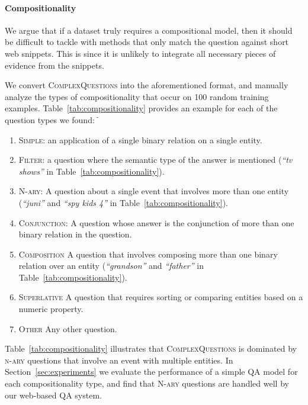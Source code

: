\documentclass[11pt,a4paper]{article}
\newcommand\nl[1]{{\it``#1''}}
\begin{document}
\paragraph{Compositionality}
We argue that if a dataset truly requires a compositional model, then it should be difficult to tackle with methods that only match the question against short web snippets. This is since it is unlikely to integrate all necessary pieces of evidence from the snippets.

We convert \textsc{ComplexQuestions} into the aforementioned format, and manually analyze the types of compositionality that occur on 100 random training examples. Table~\ref{tab:compositionality} provides an example for each of the  question types we found:
ֿ\begin{enumerate}[topsep=0pt,itemsep=0pt,partopsep=0pt,parsep=0pt]
\item[] \textsc{Simple}: an application of a single binary relation on a single entity.
\item[] \textsc{Filter}: a question where the semantic type of the answer is mentioned (\nl{tv shows} in Table~\ref{tab:compositionality}).
\item[] \textsc{N-ary}: A question about a single event that involves more than one entity (\nl{juni} and \nl{spy kids 4} in Table~\ref{tab:compositionality}).
\item[] \textsc{Conjunction}: A question whose answer is the conjunction of more than one binary relation in the question.
\item[] \textsc{Composition} A question that involves composing more than one binary relation over an entity (\nl{grandson} and \nl{father} in Table~\ref{tab:compositionality}).
\item[] \textsc{Superlative} A question that requires sorting or comparing entities based on a numeric property.
\item[] \textsc{Other} Any other question.
\end{enumerate}

Table~\ref{tab:compositionality} illustrates that \textsc{ComplexQuestions} is dominated by \textsc{n-ary} questions that involve an event with multiple entities. In Section~\ref{sec:experiments} we evaluate the performance of a simple QA model for each compositionality type, and find that \textsc{N-ary} questions are handled well by our web-based QA system.
\end{document}
